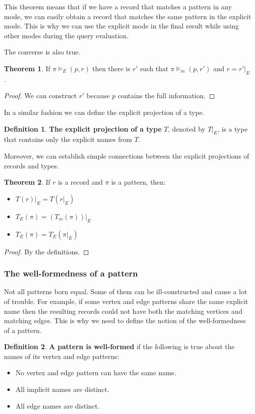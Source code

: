 \documentclass[14pt]{constructor-thesis}
\theoremstyle{definition}
\newtheorem{theorem}{Theorem}
\newtheorem{definition}{Definition}
\begin{document}
This theorem means that if we have a record that matches a pattern in any mode, we can easily obtain a record that matches the same pattern in the explicit mode. This is why we can use the explicit mode in the final result while using other modes during the query evaluation.

The converse is also true.
\begin{theorem}
  \label{thm:matching-mode-widen}
  If $\pi \models_E (p, r)$ then there is $r'$ such that $\pi \models_m (p, r')$ and $r = r'|_E$.
\end{theorem}
\begin{proof}
  We can construct $r'$ because $p$ contains the full information.
\end{proof}

In a similar fashion we can define the explicit projection of a type.
\begin{definition}
  \textbf{The explicit projection of a type} $T$, denoted by $T |_E$, is a type that contains only the explicit names from $T$.
\end{definition}

Moreover, we can establish simple connections between the explicit projections of records and types.
\begin{theorem}
  \label{thm:explicit-projections-and-types}
  If $r$ is a record and $\pi$ is a pattern, then:
  \begin{itemize}
    \item $T(r)|_E = T(r|_E)$
    \item $T_E(\pi) = (T_m(\pi)) |_E$
    \item $T_E(\pi) = T_E(\pi |_E)$
  \end{itemize}
\end{theorem}
\begin{proof}
  By the definitions.
\end{proof}

\subsubsection{The well-formedness of a pattern}

Not all patterns born equal. Some of them can be ill-constructed and cause a lot of trouble. For example, if some vertex and edge patterns share the same explicit name then the resulting records could not have both the matching vertices and matching edges. This is why we need to define the notion of the well-formedness of a pattern.

\begin{definition}
  \textbf{A pattern is well-formed} if the following is true about the names of its vertex and edge patterns:
  \begin{itemize}
    \item No vertex and edge pattern can have the same name.
    \item All implicit names are distinct.
    \item All edge names are distinct.
  \end{itemize}
\end{definition}
\end{document}
